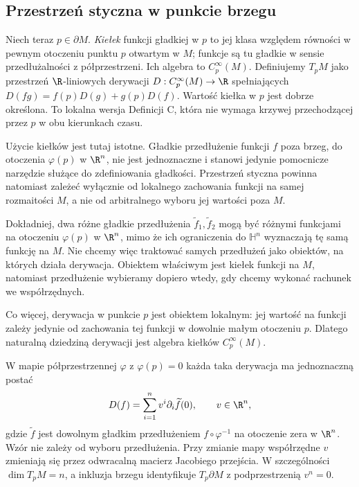 \subsection*{Przestrzeń styczna w punkcie brzegu}

Niech teraz $p\in\partial M$. \emph{Kiełek} funkcji gładkiej w $p$
to jej klasa względem równości w pewnym otoczeniu punktu $p$
otwartym w $M$;
funkcje są tu gładkie w sensie przedłużalności z półprzestrzeni.
Ich algebra to $C^\infty_p(M)$. Definiujemy $T_pM$ jako przestrzeń
$\R$-liniowych derywacji $D:C^\infty_p(M)\to\R$ spełniających $D(fg)=f(p)D(g)+g(p)D(f)$.
Wartość kiełka w $p$ jest dobrze określona. To lokalna wersja
Definicji C, która nie wymaga krzywej przechodzącej przez $p$
w obu kierunkach czasu.

Użycie kiełków jest tutaj istotne. Gładkie przedłużenie funkcji
$f$ poza brzeg, do otoczenia $\varphi(p)$ w $\R^n$, nie jest
jednoznaczne i stanowi jedynie pomocnicze narzędzie służące do
zdefiniowania gładkości. Przestrzeń styczna powinna natomiast zależeć
wyłącznie od lokalnego zachowania funkcji na samej rozmaitości $M$,
a nie od arbitralnego wyboru jej wartości poza $M$.

Dokładniej, dwa różne gładkie przedłużenia
$\widetilde f_1,\widetilde f_2$ mogą być różnymi funkcjami na
otoczeniu $\varphi(p)$ w $\R^n$, mimo że ich ograniczenia do
$\mathbb H^n$ wyznaczają tę samą funkcję na $M$. Nie chcemy więc
traktować samych przedłużeń jako obiektów, na których działa derywacja.
Obiektem właściwym jest kiełek funkcji na $M$, natomiast przedłużenie
wybieramy dopiero wtedy, gdy chcemy wykonać rachunek we współrzędnych.

Co więcej, derywacja w punkcie $p$ jest obiektem lokalnym: jej wartość
na funkcji zależy jedynie od zachowania tej funkcji w dowolnie małym
otoczeniu $p$. Dlatego naturalną dziedziną derywacji jest algebra
kiełków $C^\infty_p(M)$.

\begin{stwierdzenie}
\label{prop:styczna-brzeg-1}
W mapie półprzestrzennej $\varphi$ z $\varphi(p)=0$ każda taka
derywacja ma jednoznaczną postać
\[
D(f)=\sum_{i=1}^n v^i\partial_i\widetilde f(0),
\qquad v\in\R^n,
\]
gdzie $\widetilde f$ jest dowolnym gładkim przedłużeniem
$f\circ\varphi^{-1}$ na otoczenie zera w $\R^n$.
Wzór nie zależy od wyboru przedłużenia. Przy zmianie mapy współrzędne
$v$ zmieniają się przez odwracalną macierz Jacobiego przejścia.
W szczególności $\dim T_pM=n$, a inkluzja brzegu identyfikuje
$T_p\partial M$ z podprzestrzenią $v^n=0$.
\end{stwierdzenie}

